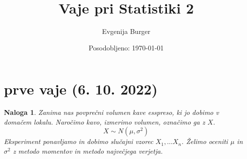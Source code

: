 \documentclass{homework}
\author{Evgenija Burger}
\date{Posodobljeno: \today}
\title{Vaje pri Statistiki 2}
\newtheorem{exercise}{Naloga}
\begin{document}
 \maketitle

\section{prve vaje (6. 10. 2022)}

\begin{exercise}
Zanima nas povprečni volumen kave esspreso, ki jo dobimo v domačem lokalu.
Naročimo kavo, izmerimo volumen, označimo ga z $X$.
$$X \sim N(\mu, \sigma^2)$$
Eksperiment ponavljamo in dobimo slučajni vzorec $X_1, \dots X_n$.
Želimo oceniti $\mu$ in $\sigma^2$ z metodo momentov in metodo največjega verjetja. 
\end{exercise}
\end{document}

